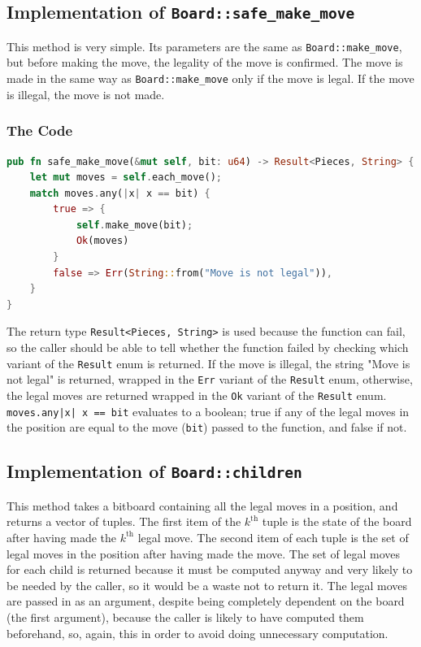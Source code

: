 \documentclass[12pt, a4paper]{report}
\begin{document}
\subsection{Implementation of \texttt{Board::safe\_make\_move}}
This method is very simple. Its parameters are the same as \texttt{Board::make\_move}, but before making the move, the legality of the move is confirmed. The move is made in the same way as \texttt{Board::make\_move} only if the move 
is legal. If the move is illegal, the move is not made.

\subsubsection{The Code}
\begin{lstlisting}[language=Rust]
pub fn safe_make_move(&mut self, bit: u64) -> Result<Pieces, String> {
    let mut moves = self.each_move();
    match moves.any(|x| x == bit) {
        true => {
            self.make_move(bit);
            Ok(moves)
        }
        false => Err(String::from("Move is not legal")),
    }
}
\end{lstlisting}

The return type \texttt{Result<Pieces, String>} is used because the function can fail, so the caller should be able to tell whether the function failed by checking which variant of the \texttt{Result} enum is returned. 
If the move is illegal, the string "Move is not legal" is returned, wrapped in the \texttt{Err} variant of the \texttt{Result} enum, 
otherwise, the legal moves are returned wrapped in the \texttt{Ok} variant of the \texttt{Result} enum.
\texttt{moves.any{|x| x == bit}} evaluates to a boolean; true if any of the legal moves in the position are equal to the move (\texttt{bit}) passed to the function, and false if not.

\subsection{Implementation of \texttt{Board::children}}
This method takes a bitboard containing all the legal moves in a position, and returns a vector of tuples. The first item of the \(k^\textrm{th}\) tuple is the state of the board after having made the \(k^\textrm{th}\) legal move.
The second item of each tuple is the set of legal moves in the position after having made the move. The set of legal moves for each child is returned because it must be computed anyway and very likely to be needed by the caller,
so it would be a waste not to return it. The legal moves are passed in as an argument, despite being completely dependent on the board (the first argument), because the caller is likely to have computed them beforehand, 
so, again, this in order to avoid doing unnecessary computation.
\end{document}
